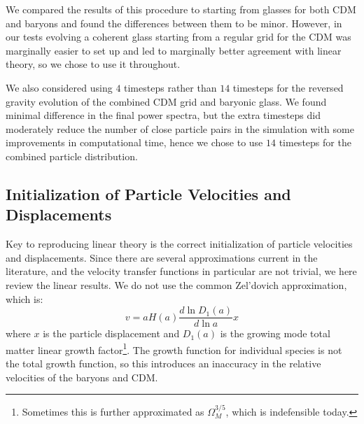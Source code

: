 \documentclass[a4paper,11pt]{article}
\newcommand{\spb}[1]{\textcolor{red}{[\bf SPB: #1]} }
\begin{document}
We compared the results of this procedure to starting from glasses for both CDM and baryons and found the differences between them to be minor. However, in our tests evolving a coherent glass starting from a regular grid for the CDM was marginally easier to set up and led to marginally better agreement with linear theory, so we chose to use it throughout.

We also considered using $4$ timesteps rather than $14$ timesteps for the reversed gravity evolution of the combined CDM grid and baryonic glass. We found minimal difference in the final power spectra, but the extra timesteps did moderately reduce the number of close particle pairs in the simulation with some improvements in computational time, hence we chose to use $14$ timesteps for the combined particle distribution.


\subsection{Initialization of Particle Velocities and Displacements}

Key to reproducing linear theory is the correct initialization of particle velocities and displacements. Since there are several approximations current in the literature, and the velocity transfer functions in particular are not trivial, we here review the linear results. We do not use the common Zel'dovich approximation, which is:
\begin{equation}
 v = a H(a) \frac{d \ln D_1(a)}{d \ln a} x
\end{equation}
where $x$ is the particle displacement and $D_1(a)$ is the growing mode total matter linear growth factor\footnote{Sometimes this is further approximated as $\Omega_M^{3/5}$, which is indefensible today.}. The growth function for individual species is not the total growth function, so this introduces an inaccuracy in the relative velocities of the baryons and CDM.
\end{document}
